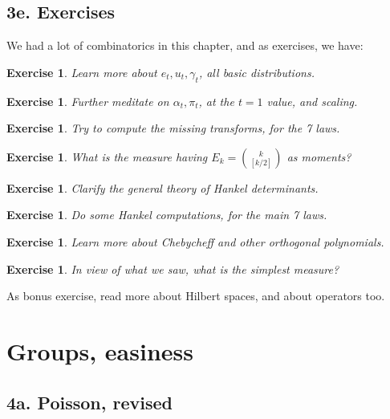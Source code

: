 \documentclass[12pt]{amsbook}
\newtheorem{exercise}[theorem]{Exercise}
\begin{document}
\section*{3e. Exercises}

We had a lot of combinatorics in this chapter, and as exercises, we have:

\begin{exercise}
Learn more about $e_t,u_t,\gamma_t$, all basic distributions.
\end{exercise}

\begin{exercise}
Further meditate on $\alpha_t,\pi_t$, at the $t=1$ value, and scaling.
\end{exercise}

\begin{exercise}
Try to compute the missing transforms, for the 7 laws.
\end{exercise}

\begin{exercise}
What is the measure having $E_k=\binom{k}{[k/2]}$ as moments?
\end{exercise}

\begin{exercise}
Clarify the general theory of Hankel determinants.
\end{exercise}

\begin{exercise}
Do some Hankel computations, for the main 7 laws.
\end{exercise}

\begin{exercise}
Learn more about Chebycheff and other orthogonal polynomials.
\end{exercise}

\begin{exercise}
In view of what we saw, what is the simplest measure?
\end{exercise}

As bonus exercise, read more about Hilbert spaces, and about operators too.

\chapter{Groups, easiness}

\section*{4a. Poisson, revised}
\end{document}
